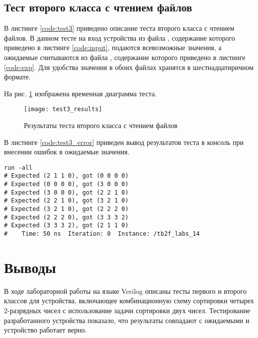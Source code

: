 \subsection{Тест второго класса с чтением файлов}

В листинге \ref{code:test3} приведено описание теста второго класса с чтением файлов. В данном тесте на вход устройства из файла , содержание которого приведено в листинге \ref{code:input}, подаются всевозможные значения, а ожидаемые считываются из файла , содержание которого приведено в листинге \ref{code:exp}. Для удобства значения в обоих файлах хранятся в шестнадцатиричном формате.

\begin{multicols}{2}
		
	
\end{multicols}

На рис. \ref{fig:test3_results} изображена временная диаграмма теста.
\vspace{-0.5cm}
\begin{figure}[H]
	\begin{center}
		\texttt{[image: test3\_results]}
		\caption{Результаты теста второго класса с чтением файлов}
		\label{fig:test3_results}
	\end{center}
\end{figure}
\vspace{-0.5cm}

В листинге \ref{code:test3_error} приведен вывод результатов теста в консоль при внесении ошибок в ожидаемые значения.
\begin{lstlisting}[caption=Результаты ошибочного теста второго класса с чтением файлов, label=code:test3_error, style=console]
run -all
# Expected (2 1 1 0), got (0 0 0 0)
# Expected (0 0 0 0), got (3 0 0 0)
# Expected (3 0 0 0), got (2 2 1 0)
# Expected (2 2 1 0), got (3 2 1 0)
# Expected (3 2 1 0), got (2 2 2 0)
# Expected (2 2 2 0), got (3 3 3 2)
# Expected (3 3 3 2), got (2 1 1 0)
#    Time: 50 ns  Iteration: 0  Instance: /tb2f_labs_14
\end{lstlisting}

\section{Выводы}

В ходе лабораторной работы на языке Verilog описаны тесты первого и второго классов для устройства, включающее комбинационную схему сортировки четырех $2$-разрядных чисел с использование задачи сортировки двух чисел. Тестирование разработанного устройства показало, что результаты совпадают с ожидаемыми и устройство работает верно.

